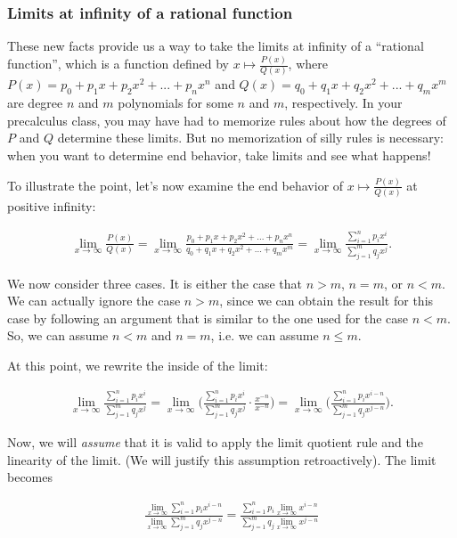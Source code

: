 \subsubsection*{Limits at infinity of a rational function}

These new facts provide us a way to take the limits at infinity of a ``rational function'', which is a function defined by $x \mapsto \frac{P(x)}{Q(x)}$, where $P(x) = p_0 + p_1 x + p_2 x^2 + ... + p_n x^n$ and $Q(x) = q_0 + q_1 x + q_2 x^2 + ... + q_m x^m$ are degree $n$ and $m$ polynomials for some $n$ and $m$, respectively. In your precalculus class, you may have had to memorize rules about how the degrees of $P$ and $Q$ determine these limits. But no memorization of silly rules is necessary: when you want to determine end behavior, take limits and see what happens!

To illustrate the point, let's now examine the end behavior of $x \mapsto \frac{P(x)}{Q(x)}$ at positive infinity:

\begin{align*}
    \lim_{x \rightarrow \infty} \frac{P(x)}{Q(x)} 
    = \lim_{x \rightarrow \infty} \frac{p_0 + p_1 x + p_2 x^2 + ... + p_n x^n}{q_0 + q_1 x + q_2 x^2 + ... + q_m x^m} 
    = \lim_{x \rightarrow \infty} \frac{\sum_{i = 1}^n p_i x^i}{\sum_{j = 1}^m q_j x^j}.
\end{align*}

We now consider three cases. It is either the case that $n > m$, $n = m$, or $n < m$. We can actually ignore the case $n > m$, since we can obtain the result for this case by following an argument that is similar to the one used for the case $n < m$. So, we can assume $n < m$ and $n = m$, i.e. we can assume $n \leq m$.

At this point, we rewrite the inside of the limit:

\begin{align*}
    \lim_{x \rightarrow \infty} \frac{\sum_{i = 1}^n p_i x^i}{\sum_{j = 1}^m q_j x^j} 
    = \lim_{x \rightarrow \infty} \Big( \frac{\sum_{i = 1}^n p_i x^i}{\sum_{j = 1}^m q_j x^j} \cdot \frac{x^{-n}}{x^{-n}} \Big)
    = \lim_{x \rightarrow \infty} \Big( \frac{\sum_{i = 1}^n p_i x^{i - n}}{\sum_{j = 1}^m q_j x^{j - n}} \Big).
\end{align*}

Now, we will \textit{assume} that it is valid to apply the limit quotient rule and the linearity of the limit. (We will justify this assumption retroactively). The limit becomes

\begin{align*}
    \frac{\lim_{x \rightarrow \infty} \sum_{i = 1}^n p_i x^{i - n}}{\lim_{x \rightarrow \infty} \sum_{j = 1}^m q_j x^{j - n}}
    = \frac{\sum_{i = 1}^n p_i \lim_{x \rightarrow \infty} x^{i - n}}{\sum_{j = 1}^m q_j \lim_{x \rightarrow \infty} x^{j - n}}
\end{align*}

